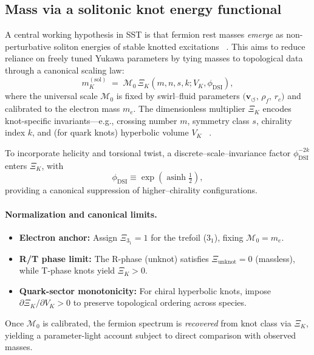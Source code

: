 \documentclass[10pt,reprint,aps,onecolumn,nofootinbib]{revtex4-2}
\begin{document}
    \subsection*{Mass via a solitonic knot energy functional}
        A central working hypothesis in SST is that fermion rest masses \emph{emerge} as non-perturbative soliton energies of stable knotted excitations~ \cite{sstLagrangian}. This aims to reduce reliance on freely tuned Yukawa parameters by tying masses to topological data through a canonical scaling law:
        \begin{equation} \label{eq:masslaw}
            m_K^{(\mathrm{sol})} \;=\; \mathcal{M}_0 \,\Xi_K(m,n,s,k;V_K,\phi_{\mathrm{DSI}}),
        \end{equation}
        where the universal scale $\mathcal{M}_0$ is fixed by swirl–fluid parameters $\big(\mathbf{v}_{\!\boldsymbol{\circlearrowleft}},\,\rho_{\!f},\,r_c\big)$ and calibrated to the electron mass $m_e$. The dimensionless multiplier $\Xi_K$ encodes knot-specific invariants—e.g., crossing number $m$, symmetry class $s$, chirality index $k$, and (for quark knots) hyperbolic volume $V_K$~ \cite{sstLagrangian}.

        To incorporate helicity and torsional twist, a discrete–scale–invariance factor $\phi_{\mathrm{DSI}}^{-2k}$ enters $\Xi_K$, with
        \[
            \phi_{\mathrm{DSI}} \equiv \exp\!\left(\operatorname{asinh}\tfrac12\right),
        \]
        providing a canonical suppression of higher–chirality configurations.

        \paragraph{Normalization and canonical limits.}
            \begin{itemize}
            \item \textbf{Electron anchor:} Assign $\Xi_{3_1}=1$ for the trefoil ($3_1$), fixing $\mathcal{M}_0=m_e$.
            \item \textbf{R/T phase limit:} The R-phase (unknot) satisfies $\Xi_{\mathrm{unknot}}=0$ (massless), while T-phase knots yield $\Xi_K>0$.
            \item \textbf{Quark-sector monotonicity:} For chiral hyperbolic knots, impose $\partial \Xi_K/\partial V_K>0$ to preserve topological ordering across species.
            \end{itemize}
            Once $\mathcal{M}_0$ is calibrated, the fermion spectrum is \emph{recovered} from knot class via $\Xi_K$, yielding a parameter-light account subject to direct comparison with observed masses.
\end{document}
